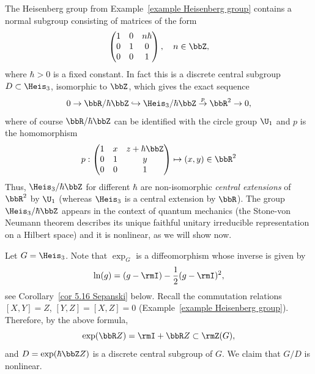 \begin{example}\label{example quantum heisenberg}
    The Heisenberg group from Example~\ref{example Heisenberg group} contains a normal subgroup consisting of matrices of the form
    \[
    \begin{pmatrix}
        1&0&n\hbar\\
        0&1&0\\
        0&0&1
    \end{pmatrix},\quad n\in\bbZ,
    \]
    where $\hbar >0$ is a fixed constant. In fact this is a discrete central subgroup $D\subset \Heis_3$, isomorphic to $\bbZ$, which gives the exact sequence
    \[0\to \bbR\slash \hbar\bbZ\hookrightarrow \Heis_3\slash \hbar\bbZ \overset{p}{\to} \bbR^2\to 0,\]
    where of course $\bbR\slash\hbar\bbZ$ can be identified with the circle group $\U_1$ and $p$ is the homomorphism
    \[p: 
     \begin{pmatrix}
        1&x&z+\hbar\bbZ\\
        0&1&y\\
        0&0&1
    \end{pmatrix}
    \mapsto (x,y)\in\bbR^2
    \]
    Thus, $\Heis_3\slash\hbar \bbZ$ for different $\hbar$ are non-isomorphic \emph{central extensions} of $\bbR^2$ by $\U_1$ (whereas $\Heis_3$ is a central extension by $\bbR$). The group $\Heis_3\slash \hbar\bbZ$ appears in the context of quantum mechanics (the Stone-von Neumann theorem describes its unique faithful unitary irreducible representation on a Hilbert space) and it is nonlinear, as we will show now.
    
    Let $G=\Heis_3$. Note that $\exp_G$ is a diffeomorphism whose inverse is given by 
    \[\ln(g)=(g-\rmI)-\frac12(g-\rmI)^2,\]
    see Corollary~\ref{cor 5.16 Sepanski} below. Recall the commutation relations $[X,Y]=Z$, $[Y,Z]=[X,Z]=0$ (Example~\ref{example Heisenberg group}). Therefore, by the above formula,
    \[\exp(\bbR Z)=\rmI+\bbR Z\subset \rmZ(G),\]
    and $D=\exp(\hbar\bbZ Z)$ is a discrete central subgroup of $G$. We claim that $G\slash D$ is nonlinear.


\end{example}
